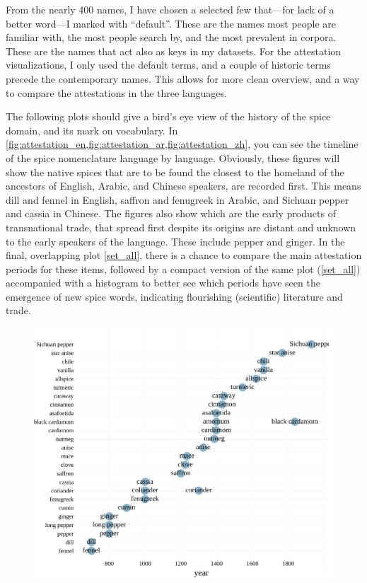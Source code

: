 From the nearly 400 names, I have chosen a selected few that---for lack of a better word---I marked with ``default''. These are the names most people are familiar with, the most people search by, and the most prevalent in corpora. These are the names that act also as keys in my datasets. For the attestation visualizations, I only used the default terms, and a couple of historic terms precede the contemporary names. This allows for more clean overview, and a way to compare the attestations in the three languages. 

The following plots should give a bird's eye view of the history of the spice domain, and its mark on vocabulary. In \cref{fig:attestation_en,fig:attestation_ar,fig:attestation_zh}, you can see the timeline of the spice nomenclature language by language. Obviously, these figures will show the native spices that are to be found the closest to the homeland of the ancestors of English, Arabic, and Chinese speakers, are recorded first. This means dill and fennel in English, saffron and fenugreek in Arabic, and Sichuan pepper and cassia in Chinese. The figures also show which are the early products of transnational trade, that spread first despite its origins are distant and unknown to the early speakers of the language. These include pepper and ginger. In the final, overlapping plot \cref{set_all}, there is a chance to compare the main attestation periods for these items, followed by a compact version of the same plot (\cref{set_all}) accompanied with a histogram to better see which periods have seen the emergence of new spice words, indicating flourishing (scientific) literature and trade. 



\begin{figure}[!ht]
  \centering
  \includegraphics[width=\linewidth]{imgs/plots/attestation_en.pdf}
  \caption{}
  \label{fig:attestation_en}
\end{figure}

